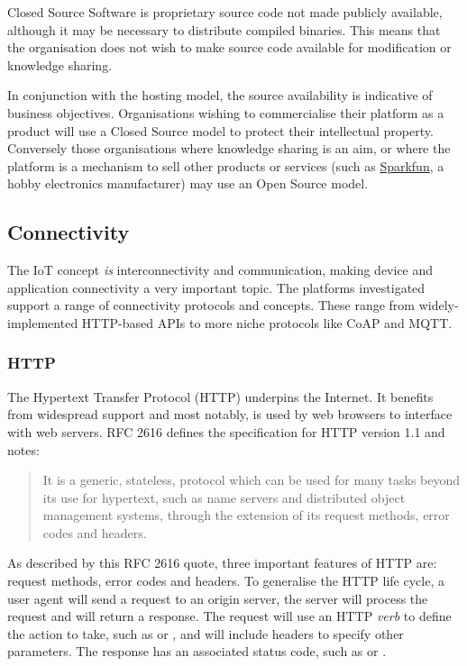       Closed Source Software is proprietary source code not made publicly available, although it may be necessary to distribute compiled binaries. This means that the organisation does not wish to make source code available for modification or knowledge sharing. 

      In conjunction with the hosting model, the source availability is indicative of business objectives. Organisations wishing to commercialise their platform as a product will use a Closed Source model to protect their intellectual property. Conversely those organisations where knowledge sharing is an aim, or where the platform is a mechanism to sell other products or services (such as \href{https://data.sparkfun.com/}{Sparkfun}, a hobby electronics manufacturer) may use an Open Source model.

    \subsection{Connectivity}
      The IoT concept \emph{is} interconnectivity and communication, making device and application connectivity a very important topic. The platforms investigated support a range of connectivity protocols and concepts. These range from widely-implemented HTTP-based APIs to more niche protocols like CoAP and MQTT.

      \subsubsection{HTTP}
        The Hypertext Transfer Protocol (HTTP) underpins the Internet. It benefits from widespread support and most notably, is used by web browsers to interface with web servers. RFC 2616 \citep{rfc2616} defines the specification for HTTP version 1.1 and notes:

          \begin{quote}It is a generic, stateless, protocol which can be used for many tasks beyond its use for hypertext, such as name servers and distributed object management systems, through the extension of its request methods, error codes and headers.\end{quote}

        As described by this RFC 2616 quote, three important features of HTTP are: request methods, error codes and headers. To generalise the HTTP life cycle, a user agent will send a request to an origin server, the server will process the request and will return a response. The request will use an HTTP \emph{verb} to define the action to take, such as  or , and will include headers to specify other parameters. The response has an associated status code, such as  or .

